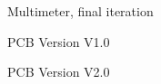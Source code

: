 \begin{figure}[h]
    \centering
    \caption{Multimeter, final iteration}
    \label{fig:MM_final}
\end{figure}

\begin{figure}[h]
    \centering
    \caption{PCB Version V1.0}
    \label{fig:pcbV1}
\end{figure}

\begin{figure}[h]
    \centering
    \caption{PCB Version V2.0}
    \label{fig:pcbV1}
\end{figure}

